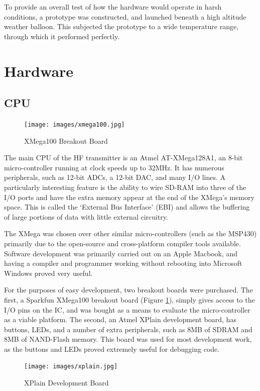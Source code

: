 \documentclass[a4paper,12pt]{article}
\begin{document}
To provide an overall test of how the hardware would operate in harsh conditions, a prototype was constructed, and launched beneath a high altitude weather balloon. This subjected the prototype to a wide temperature range, through which it performed perfectly.


\newpage
\section{Hardware}

\subsection{CPU}
\begin{figure}
  \begin{center}
    \texttt{[image: images/xmega100.jpg]}
  \end{center}
  \caption{XMega100 Breakout Board}
  \label{fig:xmega100}
\end{figure}
The main CPU of the HF transmitter is an Atmel AT-XMega128A1, an 8-bit micro-controller running at clock speeds up to 32MHz. It has numerous peripherals, such as 12-bit ADCs, a 12-bit DAC, and many I/O lines. A particularly interesting feature is the ability to wire SD-RAM into three of the I/O ports and have the extra memory appear at the end of the XMega's memory space. This is called the `External Bus Interface' (EBI) and allows the buffering of large portions of data with little external circuitry.

The XMega was chosen over other similar micro-controllers (such as the MSP430) primarily due to the open-source and cross-platform compiler tools available. Software development was primarily carried out on an Apple Macbook, and having a compiler and programmer working without rebooting into Microsoft Windows proved very useful.

For the purposes of easy development, two breakout boards were purchased. The first, a Sparkfun XMega100 breakout board (Figure \ref{fig:xmega100}), simply gives access to the I/O pins on the IC, and was bought as a means to evaluate the micro-controller as a viable platform. The second, an Atmel XPlain development board, has buttons, LEDs, and a number of extra peripherals, such as 8MB of SDRAM and 8MB of NAND-Flash memory. This board was used for most development work, as the buttons and LEDs proved extremely useful for debugging code.

\begin{figure}
  \begin{center}
    \texttt{[image: images/xplain.jpg]}
  \end{center}
  \caption{XPlain Development Board}
  \label{fig:xplain}
\end{figure}
\end{document}
